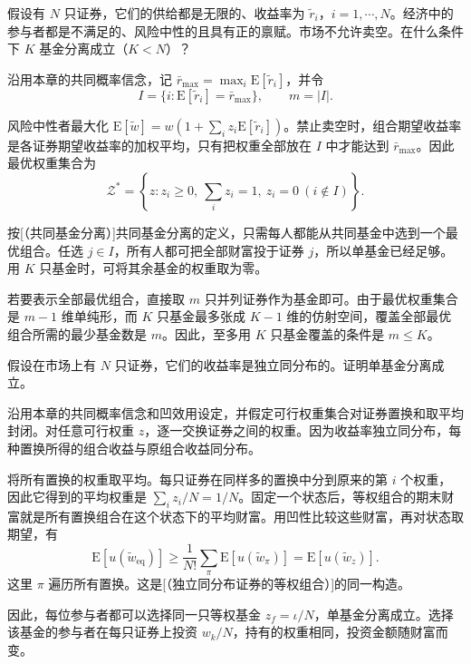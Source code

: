 \begin{problem}
 假设有 $N$ 只证券，它们的供给都是无限的、收益率为 $\tilde{r}_{i}$，$i=1,\cdots,N$。经济中的参与者都是不满足的、风险中性的且具有正的禀赋。市场不允许卖空。在什么条件下 $K$ 基金分离成立（$K<N$）？
\end{problem}
\begin{solution}[blank-type=manual,blank-vsep=7\baselineskip]
沿用本章的共同概率信念，记 $\bar r_{\max}=\max_i\mathrm E[\tilde r_i]$，并令
\[
 I=\{i:\mathrm E[\tilde r_i]=\bar r_{\max}\},\qquad m=|I|.
\]

风险中性者最大化 $\mathrm E[\tilde w]=w(1+\sum_i z_i\mathrm E[\tilde r_i])$。禁止卖空时，组合期望收益率是各证券期望收益率的加权平均，只有把权重全部放在 $I$ 中才能达到 $\bar r_{\max}$。因此最优权重集合为
\[
 \mathcal Z^*=\left\{z:z_i\ge0,\ \sum_i z_i=1,\ z_i=0\ (i\notin I)\right\}.
\]

按\ifdefined\WJHandoutKnowledge {}[（共同基金分离）]\else 共同基金分离的定义\fi，只需每人都能从共同基金中选到一个最优组合。任选 $j\in I$，所有人都可把全部财富投于证券 $j$，所以单基金已经足够。用 $K$ 只基金时，可将其余基金的权重取为零。

若要表示全部最优组合，直接取 $m$ 只并列证券作为基金即可。由于最优权重集合是 $m-1$ 维单纯形，而 $K$ 只基金最多张成 $K-1$ 维的仿射空间，覆盖全部最优组合所需的最少基金数是 $m$。因此，至多用 $K$ 只基金覆盖的条件是 $m\le K$。
\end{solution}

\begin{problem}
 假设在市场上有 $N$ 只证券，它们的收益率是独立同分布的。证明单基金分离成立。
\end{problem}
\begin{solution}[label-content={证明},blank-type=manual,blank-vsep=6\baselineskip]
沿用本章的共同概率信念和凹效用设定，并假定可行权重集合对证券置换和取平均封闭。对任意可行权重 $z$，逐一交换证券之间的权重。因为收益率独立同分布，每种置换所得的组合收益与原组合收益同分布。

将所有置换的权重取平均。每只证券在同样多的置换中分到原来的第 $i$ 个权重，因此它得到的平均权重是 $\sum_i z_i/N=1/N$。固定一个状态后，等权组合的期末财富就是所有置换组合在这个状态下的平均财富。用凹性比较这些财富，再对状态取期望，有
\[
 \mathrm E[u(\tilde w_{\mathrm{eq}})]
 \ge \frac{1}{N!}\sum_{\pi}\mathrm E[u(\tilde w_{\pi})]
 =\mathrm E[u(\tilde w_z)].
\]
这里 $\pi$ 遍历所有置换。这是[（独立同分布证券的等权组合）]的同一构造。

因此，每位参与者都可以选择同一只等权基金 $z_f=\iota/N$，单基金分离成立。选择该基金的参与者在每只证券上投资 $w_k/N$，持有的权重相同，投资金额随财富而变。
\end{solution}

